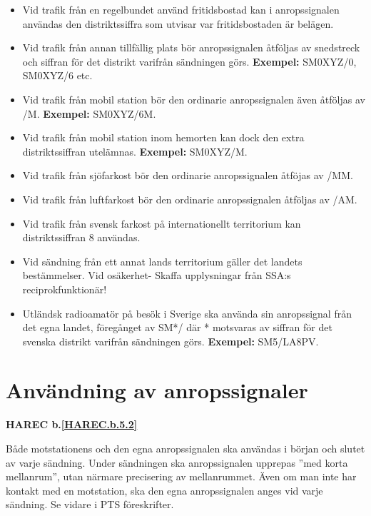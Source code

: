 \begin{itemize}

\item Vid trafik från en regelbundet använd fritidsbostad kan i
  anropssignalen användas den distriktssiffra som utvisar var
  fritidsbostaden är belägen.

\item Vid trafik från annan tillfällig plats bör anropssignalen
  åtföljas av snedstreck och siffran för det distrikt varifrån
  sändningen görs. \textbf{Exempel:} SM0XYZ/0, SM0XYZ/6 etc.

\item Vid trafik från mobil station bör den ordinarie anropssignalen
  även åtföljas av /M.  \textbf{Exempel:} SM0XYZ/6M.

\item Vid trafik från mobil station inom hemorten kan dock den extra
  distriktssiffran utelämnas.  \textbf{Exempel:} SM0XYZ/M.

\item Vid trafik från sjöfarkost bör den ordinarie anropssignalen
 åtföjas av /MM.

\item Vid trafik från luftfarkost bör den ordinarie anropssignalen
  åtföljas av /AM.

\item Vid trafik från svensk farkost på internationellt territorium
 kan distriktssiffran 8 användas.

\item Vid sändning från ett annat lands territorium gäller det landets
  bestämmelser.  Vid osäkerhet- Skaffa upplysningar från SSA:s
  reciprokfunktionär!

\item Utländsk radioamatör på besök i Sverige ska använda sin
  anropssignal från det egna landet, föregånget av SM*/ där *
  motsvaras av siffran för det svenska distrikt varifrån sändningen
  görs. \textbf{Exempel:} SM5/LA8PV.
\end{itemize}

\section{Användning av anropssignaler}
\textbf{
HAREC b.\ref{HAREC.b.5.2}\label{myHAREC.b.5.2}
}

Både motstationens och den egna anropssignalen ska användas i början
och slutet av varje sändning.  Under sändningen ska anropssignalen
upprepas ''med korta mellanrum'', utan närmare precisering av
mellanrummet.  Även om man inte har kontakt med en motstation, ska
den egna anropssignalen anges vid varje sändning.  Se vidare i PTS
föreskrifter.

